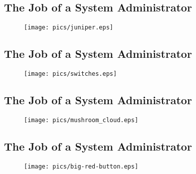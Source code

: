 \documentclass[xga]{xdvislides}
\begin{document}
\subsection{The Job of a System Administrator}
\vspace*{\fill}
\begin{figure}[hb]
	\begin{center}
		\texttt{[image: pics/juniper.eps]} \\
	\end{center}
\end{figure}
\vspace*{\fill}

\subsection{The Job of a System Administrator}
\vspace*{\fill}
\begin{figure}[hb]
	\begin{center}
		\texttt{[image: pics/switches.eps]} \\
	\end{center}
\end{figure}
\vspace*{\fill}

\subsection{The Job of a System Administrator}
\vspace*{\fill}
\begin{figure}[hb]
	\begin{center}
		\texttt{[image: pics/mushroom\_cloud.eps]} \\
	\end{center}
\end{figure}
\vspace*{\fill}

\subsection{The Job of a System Administrator}
\vspace*{\fill}
\begin{figure}[hb]
	\begin{center}
		\texttt{[image: pics/big-red-button.eps]} \\
	\end{center}
\end{figure}
\vspace*{\fill}
\end{document}
